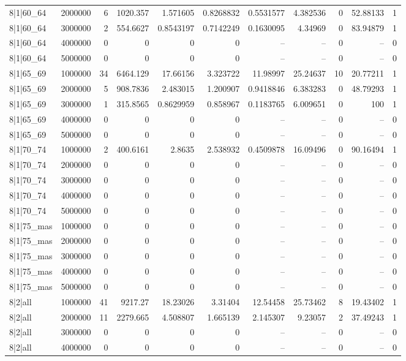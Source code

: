 \begin{tabular}{lrrrrrrrrrr}
8|1|60\_64 & 2000000 & 6 & 1020.357 & 1.571605 & 0.8268832 & 0.5531577 & 4.382536 & 0 & 52.88133 & 1 \\
8|1|60\_64 & 3000000 & 2 & 554.6627 & 0.8543197 & 0.7142249 & 0.1630095 & 4.34969 & 0 & 83.94879 & 1 \\
8|1|60\_64 & 4000000 & 0 & 0 & 0 & 0 & -- & -- & 0 & -- & 0 \\
8|1|60\_64 & 5000000 & 0 & 0 & 0 & 0 & -- & -- & 0 & -- & 0 \\
8|1|65\_69 & 1000000 & 34 & 6464.129 & 17.66156 & 3.323722 & 11.98997 & 25.24637 & 10 & 20.77211 & 1 \\
8|1|65\_69 & 2000000 & 5 & 908.7836 & 2.483015 & 1.200907 & 0.9418846 & 6.383283 & 0 & 48.79293 & 1 \\
8|1|65\_69 & 3000000 & 1 & 315.8565 & 0.8629959 & 0.858967 & 0.1183765 & 6.009651 & 0 & 100 & 1 \\
8|1|65\_69 & 4000000 & 0 & 0 & 0 & 0 & -- & -- & 0 & -- & 0 \\
8|1|65\_69 & 5000000 & 0 & 0 & 0 & 0 & -- & -- & 0 & -- & 0 \\
8|1|70\_74 & 1000000 & 2 & 400.6161 & 2.8635 & 2.538932 & 0.4509878 & 16.09496 & 0 & 90.16494 & 1 \\
8|1|70\_74 & 2000000 & 0 & 0 & 0 & 0 & -- & -- & 0 & -- & 0 \\
8|1|70\_74 & 3000000 & 0 & 0 & 0 & 0 & -- & -- & 0 & -- & 0 \\
8|1|70\_74 & 4000000 & 0 & 0 & 0 & 0 & -- & -- & 0 & -- & 0 \\
8|1|70\_74 & 5000000 & 0 & 0 & 0 & 0 & -- & -- & 0 & -- & 0 \\
8|1|75\_mas & 1000000 & 0 & 0 & 0 & 0 & -- & -- & 0 & -- & 0 \\
8|1|75\_mas & 2000000 & 0 & 0 & 0 & 0 & -- & -- & 0 & -- & 0 \\
8|1|75\_mas & 3000000 & 0 & 0 & 0 & 0 & -- & -- & 0 & -- & 0 \\
8|1|75\_mas & 4000000 & 0 & 0 & 0 & 0 & -- & -- & 0 & -- & 0 \\
8|1|75\_mas & 5000000 & 0 & 0 & 0 & 0 & -- & -- & 0 & -- & 0 \\
8|2|all & 1000000 & 41 & 9217.27 & 18.23026 & 3.31404 & 12.54458 & 25.73462 & 8 & 19.43402 & 1 \\
8|2|all & 2000000 & 11 & 2279.665 & 4.508807 & 1.665139 & 2.145307 & 9.23057 & 2 & 37.49243 & 1 \\
8|2|all & 3000000 & 0 & 0 & 0 & 0 & -- & -- & 0 & -- & 0 \\
8|2|all & 4000000 & 0 & 0 & 0 & 0 & -- & -- & 0 & -- & 0 \\

\end{tabular}
